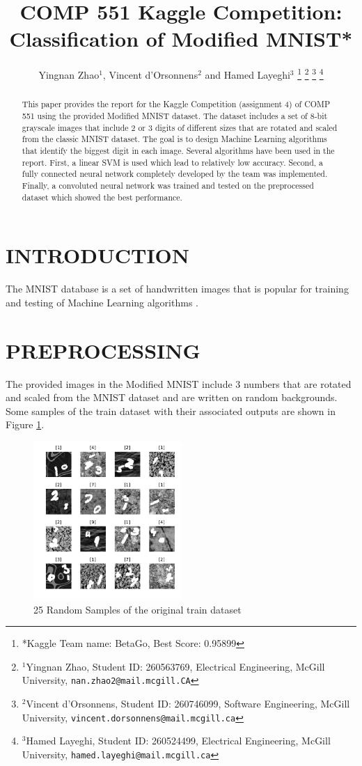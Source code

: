 \documentclass[letterpaper, 10 pt, conference]{ieeeconf}  %
\title{\LARGE \bf
COMP 551 Kaggle Competition: Classification of Modified MNIST*
}
\author{Yingnan Zhao$^{1}$, Vincent d'Orsonnens$^{2}$ and Hamed Layeghi$^{3}$%
\thanks{*Kaggle Team name: BetaGo, Best Score: 0.95899}%
\thanks{$^{1}$Yingnan Zhao, Student ID: 260563769, Electrical Engineering, 
        McGill University,
        {\tt\small nan.zhao2@mail.mcgill.CA}}%
\thanks{$^{2}$Vincent d'Orsonnens, Student ID: 260746099, Software Engineering, McGill University, 
        {\tt\small vincent.dorsonnens@mail.mcgill.ca}}%
\thanks{$^{3}$Hamed Layeghi, Student ID: 260524499, Electrical Engineering, McGill University, 
	{\tt\small hamed.layeghi@mail.mcgill.ca}}%
}
\begin{document}
\maketitle
\thispagestyle{empty}
\pagestyle{empty}


\begin{abstract}
This paper provides the report for the Kaggle Competition (assignment 4) of COMP 551 using the provided Modified MNIST dataset. The dataset includes a set of 8-bit grayscale images that include 2 or 3 digits of different sizes that are rotated and scaled from the classic MNIST dataset. The goal is to design Machine Learning algorithms that identify the biggest digit in each image. Several algorithms have been used in the report. First, a linear SVM is used which lead to relatively low accuracy. Second, a fully connected neural network completely developed by the team was implemented. Finally, a convoluted neural network was trained and tested on the preprocessed dataset which showed the best performance.  
\end{abstract}


\section{INTRODUCTION}

The MNIST database \cite{MNISTcreators} is a set of handwritten images that is popular for training and testing of Machine Learning algorithms \cite{wiki:MNIST}.

\section{PREPROCESSING}
The provided images in the Modified MNIST include 3 numbers that are rotated and scaled from the MNIST dataset and are written on random backgrounds.
Some samples of the train dataset with their associated outputs are shown in Figure \ref{fig:original}.
\begin{figure}[h]
	\begin{center}
		\includegraphics[width=0.5\textwidth]{figures/originalDataset.pdf}  %
		\caption{25 Random Samples of the original train dataset}
		\label{fig:original}
	\end{center}
\end{figure}
\end{document}
